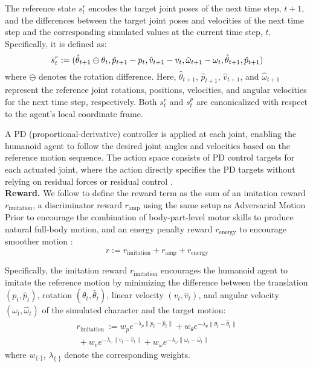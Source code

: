 The reference state $ s^{r}_{t} $ encodes the target joint poses of the next time step, $t+1$, and the differences between the target joint poses and velocities of the next time step and the corresponding simulated values at the current time step, $t$. Specifically, it is defined as:
\begin{equation}
\small
    s^{r}_{t} := (\hat{\theta}_{t+1} \ominus \theta_t, \hat{p}_{t+1} - p_t, \hat{v}_{t+1} - v_t, \hat{\omega}_{t+1} - \omega_t, \hat{\theta}_{t+1}, \hat{p}_{t+1})
\end{equation}
where $ \ominus $ denotes the rotation difference. Here, $ \hat{\theta}_{t+1} $, $ \hat{p}_{t+1} $, $ \hat{v}_{t+1} $, and $ \hat{\omega}_{t+1} $ represent the reference joint rotations, positions, velocities, and angular velocities for the next time step, respectively. Both $ s^{r}_{t} $ and $ s^{p}_{t} $ are canonicalized with respect to the agent's local coordinate frame.

A PD (proportional-derivative) controller is applied at each joint, enabling the humanoid agent to follow the desired joint angles and velocities based on the reference motion sequence. The action space consists of PD control targets for each actuated joint, where the action directly specifies the PD targets without relying on residual forces \cite{yuan2020residual} or residual control \cite{Luo2022EmbodiedSH}.\\

\noindent \textbf{Reward.} We follow \cite{Luo2023PerpetualHC} to define the reward term as the sum of an imitation reward $r_{\text{imitation}}$, a discriminator reward $r_{\text{amp}}$ using the same setup as Adversarial Motion Prior \cite{10.1145/3450626.3459670} to encourage the combination of body-part-level motor skills to produce natural full-body motion, and an energy penalty reward  $r_{\text{energy}}$ to encourage smoother motion \cite{10.1145/3550469.3555411}:
\begin{equation}
    r := r_{\text{imitation}} + r_{\text{amp}} + r_{\text{energy}}
\end{equation}

\noindent Specifically, the imitation reward $r_{\text{imitation}}$ encourages the humanoid agent to imitate the reference motion by minimizing the difference between the translation $(p_{t}, \hat{p}_{t})$, rotation $(\theta_{t}, \hat{\theta}_{t})$, linear velocity $(v_{t}, \hat{v}_{t})$, and angular velocity $(\omega_{t}, \hat{\omega}_{t})$ of the simulated character and the target motion:
\begin{equation}
    \begin{aligned}
            r_{\text{imitation}} \ := w_{p}e^{-\lambda_{p}\|p_{t} - \hat{p}_{t}\|} + w_{\theta}e^{-\lambda_{\theta}\|\theta_{t} - \hat{\theta}_{t}\|} \\
    \ + w_{v} e^{-\lambda_{v}\|v_{t} - \hat{v}_{t}\|} + w_{\omega}e^{-\lambda_{\omega}\|\omega_{t} - \hat{\omega}_{t}\|}
    \end{aligned}
\end{equation}
where $ w_{\{ \cdot \}} $, $ \lambda_{\{ \cdot \}} $ denote the corresponding weights.

